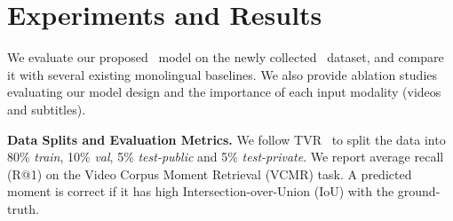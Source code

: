 \section{Experiments and Results}\label{sec:experiments}
We evaluate our proposed \ModelName~model on the newly collected \DsetName~dataset, and compare it with several existing monolingual baselines. We also provide ablation studies evaluating our model design and the importance of each input modality (videos and subtitles).

\noindent\textbf{Data Splits and Evaluation Metrics.}
We follow TVR~\cite{lei2020tvr} to split the data into 80\% \textit{train}, 10\% \textit{val}, 5\% \textit{test-public} and 5\% \textit{test-private}. We report average recall (R@1) on the Video Corpus Moment Retrieval (VCMR) task. A predicted moment is correct if it has high Intersection-over-Union (IoU) with the ground-truth.


\begin{table}[]
\centering
\small
\setlength{\tabcolsep}{1.5pt}
\renewcommand{\arraystretch}{1.05}
\vspace{-3pt}
\caption{
Baseline comparison on \DsetName~\textit{test-public} split. \ModelName~achieves better retrieval performance on both languages while using fewer parameters.}
\label{tab:vcmr_baseline_comparison}
\vspace{-3pt}
\end{table}




